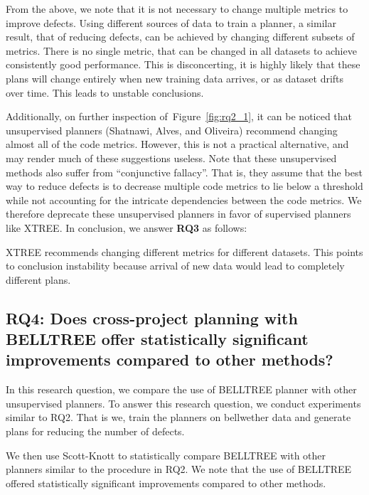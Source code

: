 \documentclass[10pt,journal,compsoc]{IEEEtran}
\newcommand{\fig}[1]{Figure~\ref{fig:#1}}
\begin{document}
From the above, we note that it is not necessary to change multiple metrics to improve defects. Using different sources of data to train a planner, a similar result, that of reducing defects, can be achieved by changing different subsets of metrics. There is no single metric, that can be changed in all datasets to achieve consistently good performance. This is disconcerting, it is highly likely that these plans will change entirely when new training data arrives, or as dataset drifts over time. This leads to unstable conclusions.

Additionally, on further inspection of~\fig{rq2_1}, it can be noticed that unsupervised planners (Shatnawi, Alves, and Oliveira) recommend changing almost all of the code metrics. However, this is not a practical alternative, and may render much of these suggestions useless. Note that these unsupervised methods also suffer from ``conjunctive fallacy''. That is, they assume that the best way to reduce defects is to decrease multiple code metrics to lie below a threshold while not accounting for the intricate dependencies between the code metrics. We therefore deprecate these unsupervised planners in favor of supervised planners like XTREE. In conclusion, we answer \textbf{RQ3} as follows: 

\begin{lesson}
	XTREE recommends changing different metrics for different datasets. This points to conclusion instability because arrival of new data would lead to completely different plans.\\[-.2cm]
\end{lesson}

\subsection*{{\bf RQ4: Does cross-project planning with BELLTREE offer statistically significant improvements compared to other methods?}}

In this research question, we compare the use of BELLTREE planner with other unsupervised planners. To answer this research question, we conduct experiments similar to RQ2. That is we, train the planners on bellwether data and generate plans for reducing the number of defects.

We then use Scott-Knott to statistically compare BELLTREE with other planners similar to the procedure in RQ2. We note that the use of BELLTREE offered statistically significant improvements compared to other methods.
\end{document}
